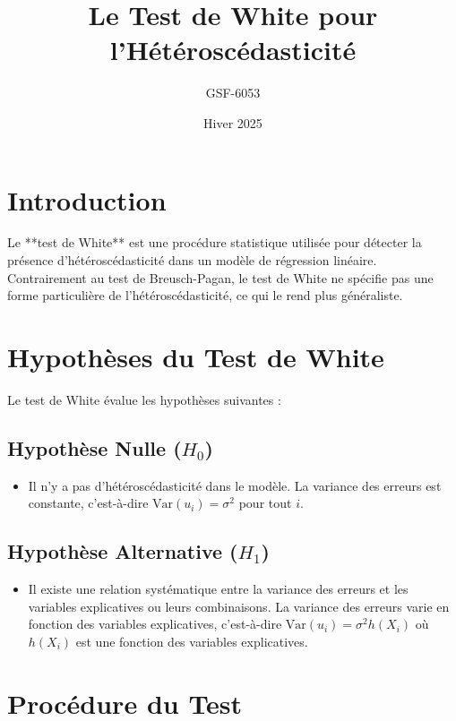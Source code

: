\documentclass[14pt]{extarticle} %
\title{Le Test de White pour l'Hétéroscédasticité}
\author{GSF-6053}
\date{Hiver 2025}
\theoremstyle{definition}
\theoremstyle{plain}
\begin{document}
\maketitle
\tableofcontents
\newpage

\section{Introduction}

Le **test de White** est une procédure statistique utilisée pour détecter la présence d'hétéroscédasticité dans un modèle de régression linéaire. Contrairement au test de Breusch-Pagan, le test de White ne spécifie pas une forme particulière de l'hétéroscédasticité, ce qui le rend plus généraliste.

\section{Hypothèses du Test de White}

Le test de White évalue les hypothèses suivantes :

\subsection{Hypothèse Nulle ($H_0$)}
\begin{itemize}
    \item Il n'y a pas d'hétéroscédasticité dans le modèle. La variance des erreurs est constante, c'est-à-dire $\text{Var}(u_i) = \sigma^2$ pour tout $i$.
\end{itemize}

\subsection{Hypothèse Alternative ($H_1$)}
\begin{itemize}
    \item Il existe une relation systématique entre la variance des erreurs et les variables explicatives ou leurs combinaisons. La variance des erreurs varie en fonction des variables explicatives, c'est-à-dire $\text{Var}(u_i) = \sigma^2 h(X_i)$ où $h(X_i)$ est une fonction des variables explicatives.
\end{itemize}

\section{Procédure du Test}
\end{document}
